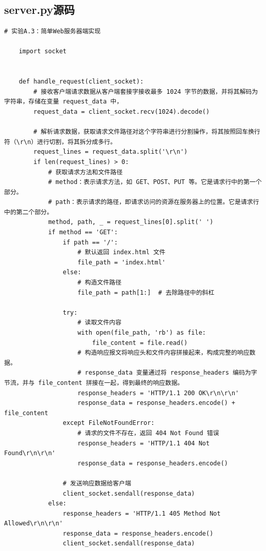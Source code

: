 \documentclass[UTF8,12pt]{article}
\begin{document}
\subsection{server.py源码}
\begin{lstlisting}[title=server.py,frame=shadowbox]
    # 实验A.3：简单Web服务器端实现

    import socket
    
    
    def handle_request(client_socket):
        # 接收客户端请求数据从客户端套接字接收最多 1024 字节的数据，并将其解码为字符串，存储在变量 request_data 中，
        request_data = client_socket.recv(1024).decode()
    
        # 解析请求数据，获取请求文件路径对这个字符串进行分割操作，将其按照回车换行符（\r\n）进行切割，将其拆分成多行。
        request_lines = request_data.split('\r\n')
        if len(request_lines) > 0:
            # 获取请求方法和文件路径
            # method：表示请求方法，如 GET、POST、PUT 等。它是请求行中的第一个部分。
            # path：表示请求的路径，即请求访问的资源在服务器上的位置。它是请求行中的第二个部分。
            method, path, _ = request_lines[0].split(' ')
            if method == 'GET':
                if path == '/':
                    # 默认返回 index.html 文件
                    file_path = 'index.html'
                else:
                    # 构造文件路径
                    file_path = path[1:]  # 去除路径中的斜杠
    
                try:
                    # 读取文件内容
                    with open(file_path, 'rb') as file:
                        file_content = file.read()
                    # 构造响应报文将响应头和文件内容拼接起来，构成完整的响应数据。
                    # response_data 变量通过将 response_headers 编码为字节流，并与 file_content 拼接在一起，得到最终的响应数据。
                    response_headers = 'HTTP/1.1 200 OK\r\n\r\n'
                    response_data = response_headers.encode() + file_content
                except FileNotFoundError:
                    # 请求的文件不存在，返回 404 Not Found 错误
                    response_headers = 'HTTP/1.1 404 Not Found\r\n\r\n'
                    response_data = response_headers.encode()
    
                # 发送响应数据给客户端
                client_socket.sendall(response_data)
            else:
                response_headers = 'HTTP/1.1 405 Method Not Allowed\r\n\r\n'
                response_data = response_headers.encode()
                client_socket.sendall(response_data)
    

\end{lstlisting}
\end{document}
